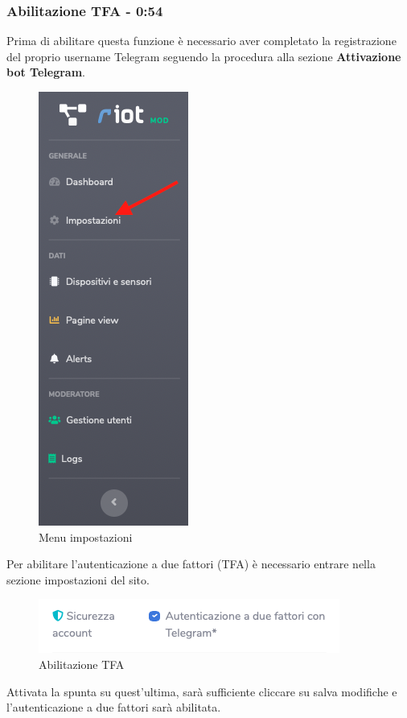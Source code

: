 	\subsubsection{Abilitazione TFA - 0:54}
	Prima di abilitare questa funzione è necessario aver completato la registrazione del proprio username Telegram seguendo la procedura alla sezione \textbf{Attivazione bot Telegram}.
	\begin{figure}[H]
		\centering
		\includegraphics[scale=0.600]{res/images/membro/menuImp.png}
		\caption{Menu impostazioni}
	\end{figure}	
	Per abilitare l'autenticazione a due fattori (TFA) è necessario entrare nella sezione impostazioni del sito.
	\begin{figure}[H]
		\centering
		\includegraphics[scale=0.600]{res/images/membro/TFAAbilitato.png}
		\caption{Abilitazione TFA}
	\end{figure}
	Attivata la spunta su quest'ultima, sarà sufficiente cliccare su salva modifiche e l'autenticazione a due fattori sarà abilitata.

